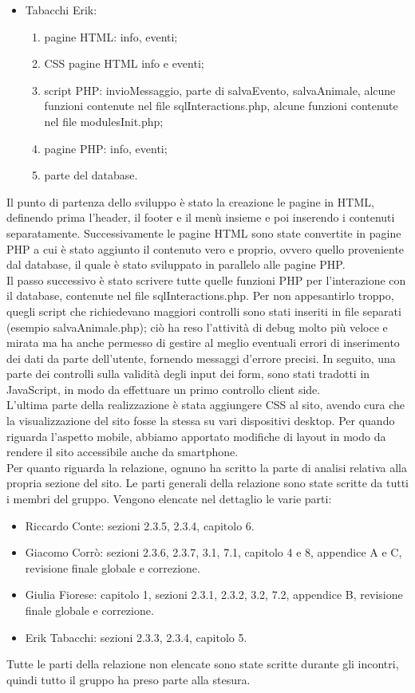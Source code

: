 \begin{itemize}
\begin{enumerate}
        \end{enumerate}
    \item Tabacchi Erik:
        \begin{enumerate}
            \item pagine HTML: info, eventi;
            \item CSS pagine HTML info e eventi;
            \item script PHP: invioMessaggio, parte di salvaEvento, salvaAnimale, alcune funzioni contenute nel file sqlInteractions.php, alcune funzioni contenute nel file modulesInit.php;
            \item pagine PHP: info, eventi;
            \item parte del database.
        \end{enumerate}
\end{itemize}
Il punto di partenza dello sviluppo è stato la creazione le pagine in HTML, definendo prima l'header, il footer e il menù insieme e poi inserendo i contenuti separatamente. Successivamente le pagine HTML sono state convertite in pagine PHP a cui è stato aggiunto il contenuto vero e proprio, ovvero quello proveniente dal database, il quale è stato sviluppato in parallelo alle pagine PHP. \\
Il passo successivo è stato scrivere tutte quelle funzioni PHP per l'interazione con il database, contenute nel file sqlInteractions.php. Per non appesantirlo troppo, quegli script che richiedevano maggiori controlli sono stati inseriti in file separati (esempio salvaAnimale.php); ciò ha reso l'attività di debug molto più veloce e mirata ma ha anche permesso di gestire al meglio eventuali errori di inserimento dei dati da parte dell'utente, fornendo messaggi d'errore precisi.
In seguito, una parte dei controlli sulla validità degli input dei form, sono stati tradotti in JavaScript, in modo da effettuare un primo controllo client side.\\
L'ultima parte della realizzazione è stata aggiungere CSS al sito, avendo cura che la visualizzazione del sito fosse la stessa su vari dispositivi desktop. Per quando riguarda l'aspetto mobile, abbiamo apportato modifiche di layout in modo da rendere il sito accessibile anche da smartphone.\\
Per quanto riguarda la relazione, ognuno ha scritto la parte di analisi relativa alla propria sezione del sito. Le parti generali della relazione sono state scritte da tutti i membri del gruppo.
Vengono elencate nel dettaglio le varie parti:
\begin{itemize}
    \item Riccardo Conte: sezioni 2.3.5, 2.3.4, capitolo 6.
    \item Giacomo Corrò: sezioni 2.3.6, 2.3.7, 3.1, 7.1, capitolo 4 e 8, appendice A e C, revisione finale globale e correzione.
    \item Giulia Fiorese: capitolo 1, sezioni 2.3.1, 2.3.2, 3.2, 7.2, appendice B, revisione finale globale e correzione.
    \item Erik Tabacchi: sezioni 2.3.3, 2.3.4, capitolo 5.
\end{itemize}
Tutte le parti della relazione non elencate sono state scritte durante gli incontri, quindi tutto il gruppo ha preso parte alla stesura.
\pagebreak
